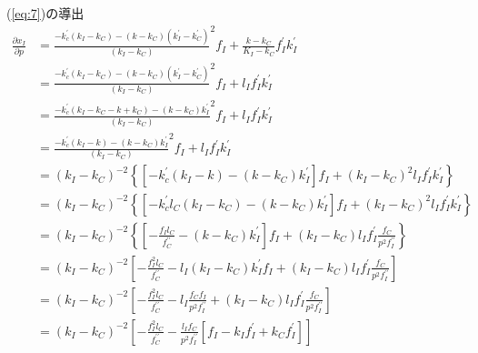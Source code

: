 \documentclass[12pt,a4paper]{jsarticle}
\begin{document}
(\ref{eq:7})の導出
\begin{align}
 \frac{\partial x_{I}}{\partial p} &= \frac{-k_{c}^{\prime}(k_{I}-k_{C})- (k-k_{C})(k_{I}^{\prime} -k_{C}^{\prime})}{(k_{I}-k_{C})}^{2}f_{I} + \frac{k - k_{C}}{K_{I} - k_{C}}f_{I}^{\prime}k_{I}^{\prime} \\
&= \frac{-k_{c}^{\prime}(k_{I}-k_{C})- (k-k_{C})(k_{I}^{\prime} -k_{C}^{\prime})}{(k_{I}-k_{C})}^{2}f_{I} + l_{I}f_{I}^{\prime}k_{I}^{\prime} \\
&=\frac{-k_{c}^{\prime}(k_{I}-k_{C} -k +k_{C})- (k-k_{C})k_{I}^{\prime} }{(k_{I}-k_{C})}^{2}f_{I} + l_{I}f_{I}^{\prime}k_{I}^{\prime} \\
&=\frac{-k_{c}^{\prime}(k_{I} - k )- (k-k_{C})k_{I}^{\prime} }{(k_{I}-k_{C})}^{2}f_{I} + l_{I}f_{I}^{\prime}k_{I}^{\prime} \\
&= (k_{I} - k_{C})^{-2} \left\{\left[-k_{c}^{\prime}(k_{I} - k )- (k-k_{C})k_{I}^{\prime} \right] f_{I} + (k_{I} - k_{C})^{2} l_{I}f_{I}^{\prime}k_{I}^{\prime} \right\}  \\
&= (k_{I} - k_{C})^{-2} \left\{ \left[-k_{c}^{\prime} l_{C} (k_{I} - k_{C} )- (k-k_{C})k_{I}^{\prime} \right] f_{I} + (k_{I} - k_{C})^{2} l_{I}f_{I}^{\prime}k_{I}^{\prime} \right\} \\
&= (k_{I} - k_{C})^{-2} \left\{ \left[-\frac{f_{I}l_{C}}{f_{C}^{\prime \prime}}- (k-k_{C})k_{I}^{\prime} \right] f_{I} + (k_{I} - k_{C}) l_{I}f_{I}^{\prime} \frac{f_{C}}{p^{2}f_{I}^{\prime \prime}} \right\} \\
&= (k_{I} - k_{C})^{-2} \left[ -\frac{f_{I}^{2} l_{C}}{f_{C}^{\prime \prime}}- l_{I}(k_{I}-k_{C})k_{I}^{\prime}  f_{I} + (k_{I} - k_{C}) l_{I}f_{I}^{\prime} \frac{f_{C}}{p^{2}f_{I}^{\prime \prime}} \right] \\
&= (k_{I} - k_{C})^{-2} \left[ -\frac{f_{I}^{2} l_{C}}{f_{C}^{\prime \prime}}- l_{I} \frac{f_{C}f_{I} }{ p^{2}f_{I}^{\prime \prime}}+ (k_{I} - k_{C}) l_{I}f_{I}^{\prime} \frac{f_{C}}{p^{2}f_{I}^{\prime \prime}} \right] \\
&= (k_{I} - k_{C})^{-2} \left[ -\frac{f_{I}^{2} l_{C}}{f_{C}^{\prime \prime}}- \frac{ l_{I} f_{C} }{ p^{2}f_{I}^{\prime \prime}}\left[ f_{I} - k_{I}f_{I}^{\prime}  + k_{C}f_{I}^{\prime}  \right] \right]
\end{align}
\end{document}
